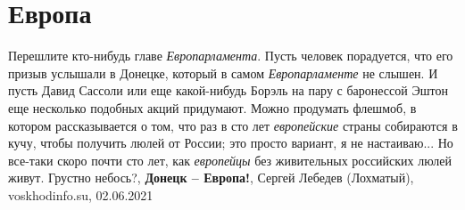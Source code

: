  
 
 
 
 
\chapter{Европа}

Перешлите кто-нибудь главе \emph{Европарламента}. Пусть человек порадуется, что
его призыв услышали в Донецке, который в самом \emph{Европарламенте} не слышен.
И пусть Давид Сассоли или еще какой-нибудь Борэль на пару с баронессой Эштон
еще несколько подобных акций придумают.  Можно продумать флешмоб, в котором
рассказывается о том, что раз в сто лет \emph{европейские} страны собираются в
кучу, чтобы получить люлей от России; это просто вариант, я не настаиваю... Но
все-таки скоро почти сто лет, как \emph{европейцы} без живительных российских
люлей живут.  Грустно небось?, 
\textbf{Донецк – Европа!}, Сергей Лебедев (Лохматый), voskhodinfo.su, 02.06.2021

